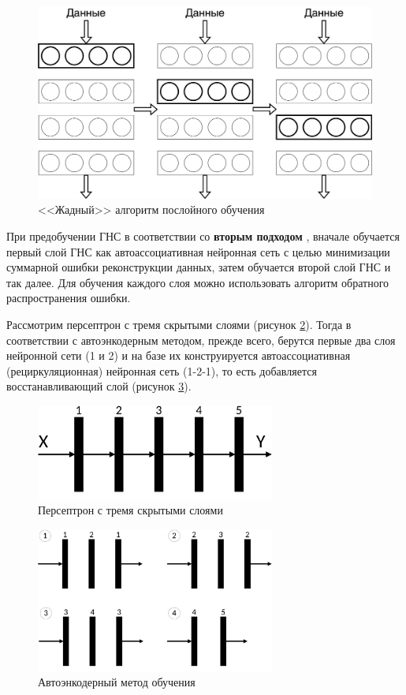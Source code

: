 \begin{figure}[H]
  \centering
  \includegraphics[width=\textwidth]{man-source/images/ch1/pic1-4.png}
  \caption{<<Жадный>> алгоритм послойного обучения}
  \label{fig:pic1_4}
\end{figure}

При предобучении ГНС в соответствии со \textbf{вторым подходом} \cite[c.~158]{n6}, вначале обучается первый слой ГНС как автоассоциативная нейронная сеть с целью минимизации суммарной ошибки реконструкции данных, затем обучается второй слой ГНС и так далее. Для обучения каждого слоя можно использовать алгоритм обратного распространения ошибки. 
	
Рассмотрим персептрон с тремя скрытыми слоями (рисунок \ref{fig:pic1_5}). Тогда в соответствии с автоэнкодерным методом, прежде всего, берутся первые два слоя нейронной сети (1 и 2) и на базе их конструируется автоассоциативная (рециркуляционная) нейронная сеть (1-2-1), то есть добавляется восстанавливающий слой (рисунок \ref{fig:pic1_6}). 
	
\begin{figure}[H]
  \centering
  \includegraphics[width=0.7\textwidth]{man-source/images/ch1/pic1-5.pdf}
  \caption{Персептрон с тремя скрытыми слоями}
  \label{fig:pic1_5}
\end{figure}	

\begin{figure}[H]
  \centering
  \includegraphics[width=0.7\textwidth]{man-source/images/ch1/pic1-6.pdf}
  \caption{Автоэнкодерный метод обучения}
  \label{fig:pic1_6}
\end{figure}

